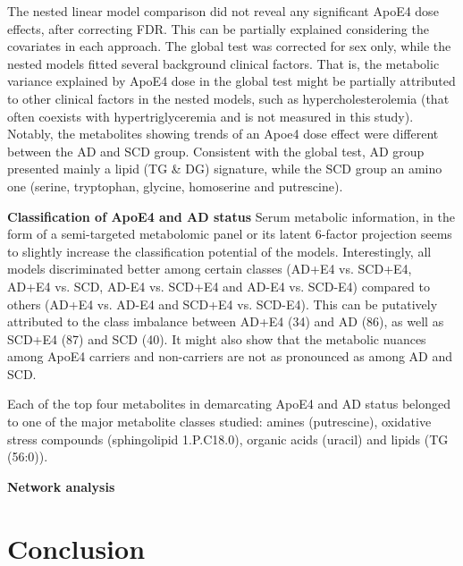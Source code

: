 \documentclass{amsart}
\begin{document}
The nested linear model comparison did not reveal any significant ApoE4 dose effects, after correcting FDR. This can be partially explained considering the covariates in each approach. The global test was corrected for sex only, while the nested models fitted several background clinical factors. That is, the metabolic variance explained by ApoE4 dose in the global test might be partially attributed to other clinical factors in the nested models, such as hypercholesterolemia (that often coexists with hypertriglyceremia and is not measured in this study). Notably, the metabolites showing trends of an Apoe4 dose effect were different between the AD and SCD group. Consistent with the global test, AD group presented mainly a lipid (TG \& DG) signature, while the SCD group an amino one (serine, tryptophan, glycine, homoserine and putrescine).

\leavevmode\newline \textbf{Classification of ApoE4 and AD status}\hspace{.25cm}
Serum metabolic information, in the form of a semi-targeted metabolomic panel or its latent 6-factor projection seems to slightly increase the classification potential of the models. Interestingly, all models discriminated better among certain classes (AD+E4 vs. SCD+E4, AD+E4 vs. SCD, AD-E4 vs. SCD+E4 and AD-E4 vs. SCD-E4) compared to others (AD+E4 vs. AD-E4 and SCD+E4 vs. SCD-E4). This can be putatively attributed to the class imbalance between AD+E4 (34) and AD (86), as well as SCD+E4 (87) and SCD (40). It might also show that the metabolic nuances among ApoE4 carriers and non-carriers are not as pronounced as among AD and SCD.

Each of the top four metabolites in demarcating ApoE4 and AD status belonged to one of the major metabolite classes studied: amines (putrescine), oxidative stress compounds (sphingolipid 1.P.C18.0), organic acids (uracil) and lipids (TG (56:0)). 

\leavevmode\newline \textbf{Network analysis}\hspace{.25cm}






\clearpage
\section{Conclusion} \label{concl}


\end{document}
